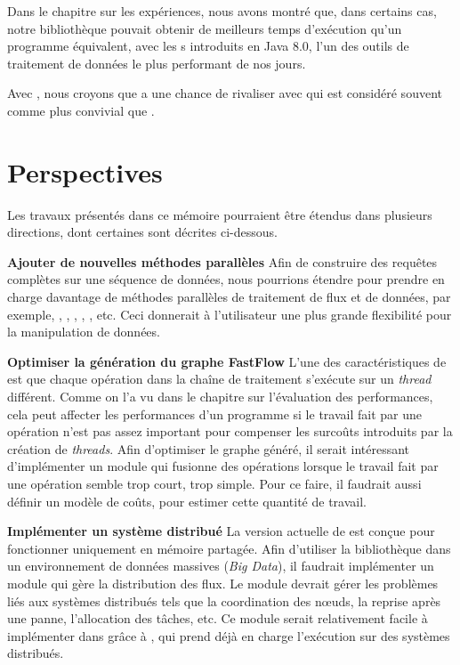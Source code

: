 \begin{conclusion}
Dans le chapitre sur les exp\'eriences, nous avons montr\'e que, dans certains cas, notre bibliothèque pouvait obtenir de meilleurs temps d'ex\'ecution qu'un programme  \'equivalent, avec les s introduits en Java 8.0, l'un des outils de traitement de donn\'ees le plus performant de nos jours.

Avec , nous croyons que  a une chance de rivaliser avec  qui est consid\'er\'e souvent comme plus convivial que . 


\section*{\textbf{Perspectives}}

Les travaux pr\'esent\'es dans ce m\'emoire pourraient \^etre \'etendus dans plusieurs directions, dont certaines sont d\'ecrites ci-dessous.

\textbf{Ajouter de nouvelles m\'ethodes parall\`eles} Afin de construire des requ\^etes compl\`etes sur une s\'equence de donn\'ees, nous pourrions \'etendre  pour prendre en charge davantage de m\'ethodes parall\`eles de traitement de flux et de donn\'ees, par exemple, , , , , , etc. Ceci donnerait \`a l'utilisateur une plus grande flexibilit\'e pour la manipulation de donn\'ees.

\textbf{Optimiser la génération du graphe FastFlow} L'une des caract\'eristiques de  est que chaque op\'eration dans la cha\^ine de traitement s'ex\'ecute sur un \emph{thread} diff\'erent. Comme on l'a vu dans le chapitre sur l'évaluation des performances, cela peut affecter les performances d'un programme si le travail fait par une op\'eration n'est pas assez important pour compenser les surco\^uts introduits par la cr\'eation de \emph{threads}. Afin d'optimiser le graphe généré, il serait intéressant d'impl\'ementer un module qui fusionne des op\'erations lorsque le travail fait par une op\'eration semble trop court, trop simple. Pour ce faire, il faudrait aussi définir un modèle de coûts, pour estimer cette quantité de travail.

\textbf{Impl\'ementer un syst\`eme distribu\'e} La version actuelle de  est con\c{c}ue pour fonctionner uniquement en m\'emoire partag\'ee. Afin d'utiliser la bibliothèque dans un environnement de donn\'ees massives (\emph{Big Data}), il faudrait impl\'ementer un module qui g\`ere la distribution des flux. Le module devrait g\'erer les probl\`emes li\'es aux syst\`emes distribu\'es tels que la coordination des nœuds, la reprise apr\`es une panne, l'allocation des t\^aches, etc. Ce module serait relativement facile \`a impl\'ementer dans  gr\^ace \`a , qui prend d\'ej\`a en charge l'ex\'ecution sur des syst\`emes distribu\'es.


\end{conclusion}




